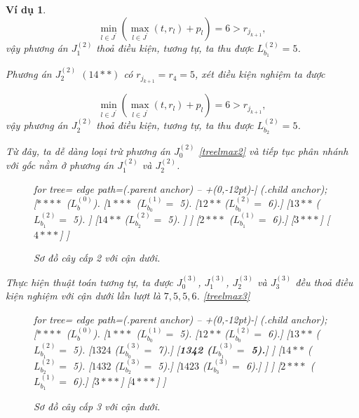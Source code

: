 \documentclass[12pt,a4paper]{report}
\newtheorem{vd}{Ví dụ}
\begin{document}
\begin{vd}
\begin{equation*}
\underset{l \in J^{'}}{\min} (\underset{l \in J^{'}}{\max} (t, r_l) + p_l) = 6 > r_{j_{k+1}},
\end{equation*}
vậy phương án $J_1^{(2)}$ thoả điều kiện, tương tự, ta thu được $L_{b_1}^{(2)} = 5$.

Phương án $J_2^{(2)}$ $(14**)$ có $r_{j_{k+1}} = r_4 = 5$, xét điều kiện nghiệm ta được

\begin{equation*}
\underset{l \in J^{'}}{\min} (\underset{l \in J^{'}}{\max} (t, r_l) + p_l) = 6 > r_{j_{k+1}},
\end{equation*}
vậy phương án $J_2^{(2)}$ thoả điều kiện, tương tự, ta thu được $L_{b_2}^{(2)} = 5$.

Từ đây, ta dễ dàng loại trừ phương án $J_0^{(2)}$ \eqref{treelmax2} và tiếp tục phân nhánh với gốc nằm ở phương án $J_1^{(2)}$ và $J_2^{(2)}$.


\begin{figure}[h!]
	\centering
	\begin{forest} for tree={
		edge path={\noexpand{} (.parent anchor) -- +(0,-12pt)-| (.child anchor);}
	}
	[{$****$ ($L_b^{(0)}$).}
		[{$1***$ ($L_{b_0}^{(1)} =$ 5).}
			[{$12**$ ($L_{b_0}^{(2)} =$ 6).}]
			[{$13**$ ($L_{b_1}^{(2)} =$ 5).}
			]
			[{$14**$ ($L_{b_2}^{(2)} =$ 5).}
			]
		]
		[{$2***$ ($L_{b_1}^{(1)} =$ 6).}]
		[$3***$]
		[$4***$]
	]
	\end{forest}
\caption{\label{treelmax2} Sơ đồ cây cấp 2 với cận dưới.}
\end{figure}

Thực hiện thuật toán tương tự, ta được $J_0^{(3)}$, $J_1^{(3)}$, $J_2^{(3)}$ và $J_3^{(3)}$ đều thoả điều kiện nghiệm với cận dưới lần lượt là $7,5,5,6$. \eqref{treelmax3}

\begin{figure}[h!]
	\centering
	\begin{forest} for tree={
		edge path={\noexpand{} (.parent anchor) -- +(0,-12pt)-| (.child anchor);}
	}
	[{$****$ ($L_b^{(0)}$).}
		[{$1***$ ($L_{b_0}^{(1)} =$ 5).}
			[{$12**$ ($L_{b_0}^{(2)} =$ 6).}]
			[{$13**$ ($L_{b_1}^{(2)} =$ 5).}
				[{$1324$ ($L_{b_0}^{(3)} =$ 7).}]
				[{\textbf{1342 ($L_{b_1}^{(3)} =$ 5).}}]
			]
			[{$14**$ ($L_{b_2}^{(2)} =$ 5).}
				[{$1432$ ($L_{b_2}^{(3)} =$ 5).}]
				[{$1423$ ($L_{b_3}^{(3)} =$ 6).}]
			]
		]
		[{$2***$ ($L_{b_1}^{(1)} =$ 6).}]
		[$3***$]
		[$4***$]
	]
	\end{forest}
\caption{\label{treelmax3} Sơ đồ cây cấp 3 với cận dưới.}
\end{figure}



\end{vd}
\end{document}
